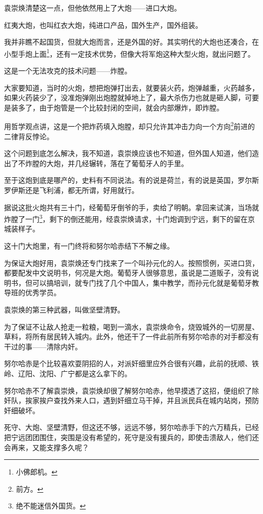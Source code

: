 \begin{multicols}{\theparacolNo}
		袁崇焕清楚这一点，但他依然用上了大炮——进口大炮。

		红夷大炮，也叫红衣大炮，纯进口产品，国外生产，国外组装。

		我并非瞧不起国货，但就大炮而言，还是外国的好。其实明代的大炮也还凑合，在小型手炮上面\footnote{小佛郎机。}，还有一定技术优势，但像大将军炮这种大型火炮，就出问题了。

		这是一个无法攻克的技术问题——炸膛。

		大家要知道，当时的火炮，想把炮弹打出去，就要装火药，炮弹越重，火药越多，如果火药装少了，没准炮弹刚出炮膛就掉地上了，最大杀伤力也就是砸人脚，可要是装多了，由于炮管是一个比较封闭的空间，就会内部爆炸，即炸膛。

		用哲学观点讲，这是一个把炸药填入炮膛，却只允许其冲击力向一个方向\footnote{前方。}前进的二律背反悖论。

		这个问题到底怎么解决，我不知道，袁崇焕应该也不知道，但外国人知道，他们造出了不炸膛的大炮，并几经辗转，落在了葡萄牙人的手里。

		至于这炮到底是哪产的，史料有不同说法。有的说是荷兰，有的说是英国，罗尔斯罗伊斯还是飞利浦，都无所谓，好用就行。

		据说这批火炮共有三十门，经葡萄牙倒爷的手，卖给了明朝。拿回来试演，当场就炸膛了一门\footnote{绝不能迷信外国货。}，剩下的倒还能用，经袁崇焕请求，十门炮调到宁远，剩下的留在京城装样子。

		这十门大炮里，有一门终将和努尔哈赤结下不解之缘。

		为保证大炮好用，袁崇焕还专门找来了一个叫孙元化的人。按照惯例，买进口货，都要配发中文说明书，何况是大炮。葡萄牙人很够意思，虽说是二道贩子，没有说明书，但可以搞培训，就专门找了几个中国人，集中教学，而孙元化就是葡萄牙教导班的优秀学员。

		袁崇焕的第三种武器，叫做坚壁清野。

		为了保证不让敌人抢走一粒粮，喝到一滴水，袁崇焕命令，烧毁城外的一切房屋、草料，将所有居民转入城内。此外，他还干了一件此前所有努尔哈赤的对手都没有干过的事——清除内奸。

		努尔哈赤是个比较喜欢耍阴招的人，对派奸细里应外合很有兴趣，此前的抚顺、铁岭、辽阳、沈阳、广宁都是这么拿下的。

		努尔哈赤不了解袁崇焕，袁崇焕却很了解努尔哈赤，他早摸透了这招，便组织了除奸队，挨家挨户查找外来人口，遇到奸细立马干掉，并且派民兵在城内站岗，预防奸细破坏。

		死守、大炮、坚壁清野，但这还不够，远远不够，努尔哈赤手下的六万精兵，已经把宁远团团围住，突围是没有希望的，死守是没有援兵的，即使击溃敌人，他们还会再来，又能支撑多久呢？


\end{multicols}
